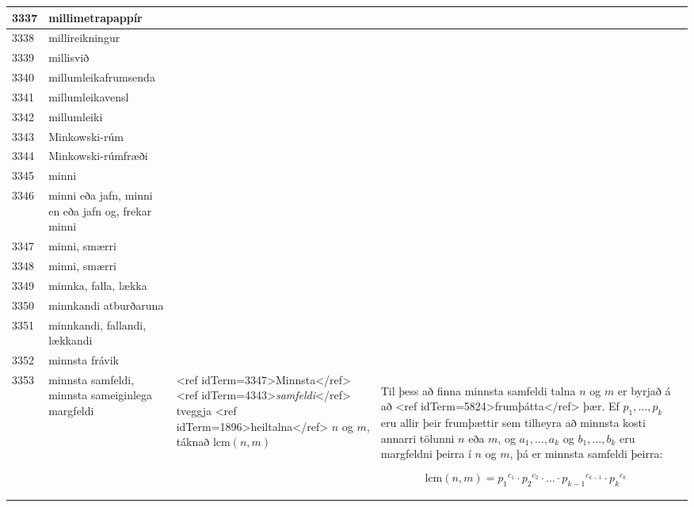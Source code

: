 \begin{longtable}{p{}|p{}|p{}|p{}|p{}}
\hline
3337 & millimetrapappír &  &  &  \\
\hline
3338 & millireikningur &  &  &  \\
\hline
3339 & millisvið &  &  &  \\
\hline
3340 & millumleikafrumsenda &  &  &  \\
\hline
3341 & millumleikavensl &  &  &  \\
\hline
3342 & millumleiki &  &  &  \\
\hline
3343 & Minkowski-rúm &  &  &  \\
\hline
3344 & Minkowski-rúmfræði &  &  &  \\
\hline
3345 & minni &  &  &  \\
\hline
3346 & minni eða jafn, minni en eða jafn og, frekar minni &  &  &  \\
\hline
3347 & minni, smærri &  &  &  \\
\hline
3348 & minni, smærri &  &  &  \\
\hline
3349 & minnka, falla, lækka &  &  &  \\
\hline
3350 & minnkandi atburðaruna &  &  &  \\
\hline
3351 & minnkandi, fallandi, lækkandi &  &  &  \\
\hline
3352 & minnsta frávik &  &  &  \\
\hline
3353 & minnsta samfeldi, minnsta sameiginlega margfeldi & <ref idTerm=3347>Minnsta</ref> <ref idTerm=4343>\textit{samfeldi}</ref> tveggja <ref idTerm=1896>heiltalna</ref> $n$ og $m$, táknað $\text{lcm}(n,m)$ & Til þess að finna minnsta samfeldi talna $n$ og $m$ er byrjað á að <ref idTerm=5824>frumþátta</ref> þær. Ef $p_{1},\ldots,p_{k}$ eru allir þeir frumþættir sem tilheyra að minnsta kosti annarri tölunni $n$ eða $m$, og $a_{1},\ldots,a_{k}$ og $b_{1},\ldots,b_{k}$ eru margfeldni þeirra í $n$ og $m$, þá er minnsta samfeldi þeirra:

\[ \text{lcm}(n,m) = {p_{1}}^{c_{1}} \cdot {p_{2}}^{c_{2}} \cdot \ldots \cdot {p_{k-1}}^{c_{k-1}} \cdot {p_{k}}^{c_{k}} \] 


\end{longtable}
